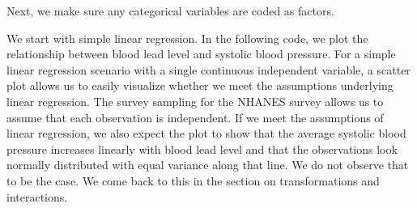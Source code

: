 \documentclass[
  letterpaper,
]{latex/krantz}
\makeatletter
\newenvironment{Shaded}{\begin{snugshade}}{\end{snugshade}}
\newcommand{\AttributeTok}[1]{\textcolor[rgb]{0.40,0.45,0.13}{#1}}
\newcommand{\DecValTok}[1]{\textcolor[rgb]{0.68,0.00,0.00}{#1}}
\newcommand{\FunctionTok}[1]{\textcolor[rgb]{0.28,0.35,0.67}{#1}}
\newcommand{\NormalTok}[1]{\textcolor[rgb]{0.00,0.23,0.31}{#1}}
\newcommand{\OtherTok}[1]{\textcolor[rgb]{0.00,0.23,0.31}{#1}}
\newcommand{\SpecialCharTok}[1]{\textcolor[rgb]{0.37,0.37,0.37}{#1}}
\newcommand{\StringTok}[1]{\textcolor[rgb]{0.13,0.47,0.30}{#1}}
\newenvironment{kframe}{%
\medskip{}
\setlength{\fboxsep}{.8em}
 \def\at@end@of@kframe{}%
 \ifinner\ifhmode%
  \def\at@end@of@kframe{\end{minipage}}%
  \begin{minipage}{\columnwidth}%
 \fi\fi%
 \def\FrameCommand##1{\hskip\@totalleftmargin \hskip-\fboxsep
 \colorbox{shadecolor}{##1}\hskip-\fboxsep
     \hskip-\linewidth \hskip-\@totalleftmargin \hskip\columnwidth}%
 \MakeFramed {\advance\hsize-\width
   \@totalleftmargin\z@ \linewidth\hsize
   \@setminipage}}%
 {\par\unskip\endMakeFramed%
 \at@end@of@kframe}
\renewenvironment{Shaded}{\begin{kframe}}{\end{kframe}}
\makeatother
\begin{document}
Next, we make sure any categorical variables are coded as factors.

\begin{Shaded}
\end{Shaded}

We start with simple linear regression. In the following code, we plot
the relationship between blood lead level and systolic blood pressure.
For a simple linear regression scenario with a single continuous
independent variable, a scatter plot allows us to easily visualize
whether we meet the assumptions underlying linear regression. The survey
sampling for the NHANES survey allows us to assume that each observation
is independent. If we meet the assumptions of linear regression, we also
expect the plot to show that the average systolic blood pressure
increases linearly with blood lead level and that the observations look
normally distributed with equal variance along that line. We do not
observe that to be the case. We come back to this in the section on
transformations and interactions.

\begin{Shaded}
\end{Shaded}
\end{document}
